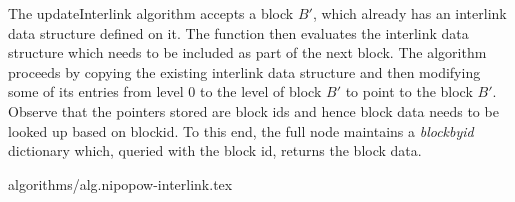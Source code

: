 The updateInterlink algorithm accepts a block $B'$, which already has an
interlink data structure defined on it. The function then evaluates the
interlink data structure which needs to be included as part of the next block.
The algorithm proceeds by copying the existing interlink data structure and
then modifying some of its entries from level $0$ to the level of block $B'$ to
point to the block $B'$. Observe that the pointers stored are block ids and
hence block data needs to be looked up based on blockid. To this end, the full
node maintains a \textit{blockbyid} dictionary which, queried with the block
id, returns the block data.

{algorithms/alg.nipopow-interlink.tex}
